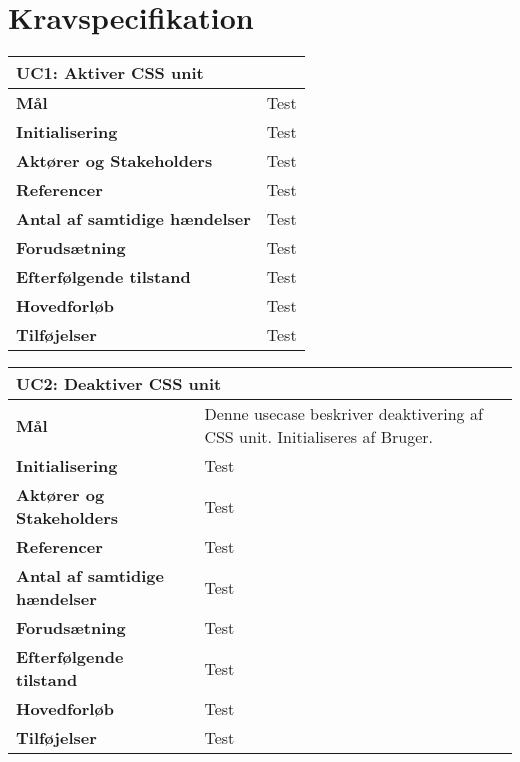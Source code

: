 \chapter{Kravspecifikation}

\begin{table}[htbp] \centering
\begin{tabular}{|l|l|} %
	\hline
\multicolumn{2}{|l|}{\textbf{UC1: Aktiver CSS unit}} \\\hline
\textbf{Mål}								&Test \\\hline
\textbf{Initialisering}					&Test \\\hline
\textbf{Aktører og Stakeholders}			&Test \\\hline
\textbf{Referencer}						&Test \\\hline
\textbf{Antal af samtidige hændelser}	&Test \\\hline
\textbf{Forudsætning}					&Test \\\hline
\textbf{Efterfølgende tilstand}			&Test \\\hline
\textbf{Hovedforløb}						&Test \\\hline
\textbf{Tilføjelser}						&Test \\\hline
	\end{tabular}
	\label{UC1} 
\end{table}

\begin{table}[htbp] \centering
\begin{tabular}{|p{7cm}|p{7cm}|} %
	\hline
\multicolumn{2}{|l|}{\textbf{UC2: Deaktiver CSS unit}} \\\hline
\textbf{Mål}	&
Denne usecase beskriver deaktivering af CSS unit. Initialiseres af Bruger. 
\\\hline
\textbf{Initialisering} &
Test 
\\\hline
\textbf{Aktører og Stakeholders}	&
Test 
\\\hline
\textbf{Referencer} &
Test 
\\\hline
\textbf{Antal af samtidige hændelser} &
Test 
\\\hline
\textbf{Forudsætning} &
Test 
\\\hline
\textbf{Efterfølgende tilstand} &
Test 
\\\hline
\textbf{Hovedforløb}	&
Test 
\\\hline
\textbf{Tilføjelser}	&
Test 
\\\hline
	\end{tabular}
	\label{tab:UC2} 
\end{table}

